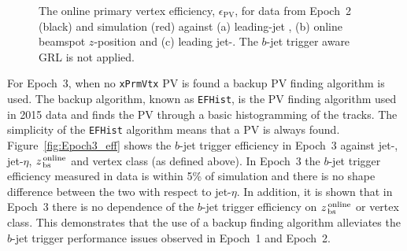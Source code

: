 \begin{figure}[!ht]
\begin{center}
\end{center}
\vspace{-1em}
\caption[The online primary vertex efficiency for data from Epoch~2 and simulation against leading-jet \pT{}, online beamspot $z$-position
  and leading jet-\eta. The $b$-jet trigger aware GRL is not applied.]
        {The online primary vertex efficiency, $\epsilon_{\text{PV}}$, for data from Epoch~2 (black) and simulation (red) against (a) leading-jet \pT{}, (b) online beamspot $z$-position
  and (c) leading jet-\eta.
  The $b$-jet trigger aware GRL is not applied.}
\label{fig:Epoch2_bperf}
\end{figure}



\newpage
For Epoch~3, when no \verb|xPrmVtx| PV is found a backup PV finding algorithm is used.
The backup algorithm, known as \verb|EFHist|, is the PV finding algorithm used in 2015 data and finds the PV through a basic histogramming of the tracks.
The simplicity of the \verb|EFHist| algorithm means that a PV is always found.
Figure~\ref{fig:Epoch3_eff} shows the $b$-jet trigger efficiency in Epoch~3 against jet-\pT, jet-$\eta$,  $z_{\,\text{bs}}^{\text{\,online}}$ and vertex class (as defined above).
In Epoch~3 the $b$-jet trigger efficiency measured in data is within 5\% of simulation and there is no shape difference between the two with respect to jet-$\eta$.
In addition, it is shown that in Epoch~3 there is no dependence of the $b$-jet trigger efficiency on $z_{\,\text{bs}}^{\text{\,online}}$ or vertex class.
This demonstrates that the use of a backup finding algorithm alleviates the $b$-jet trigger performance issues observed in Epoch~1 and Epoch~2.

